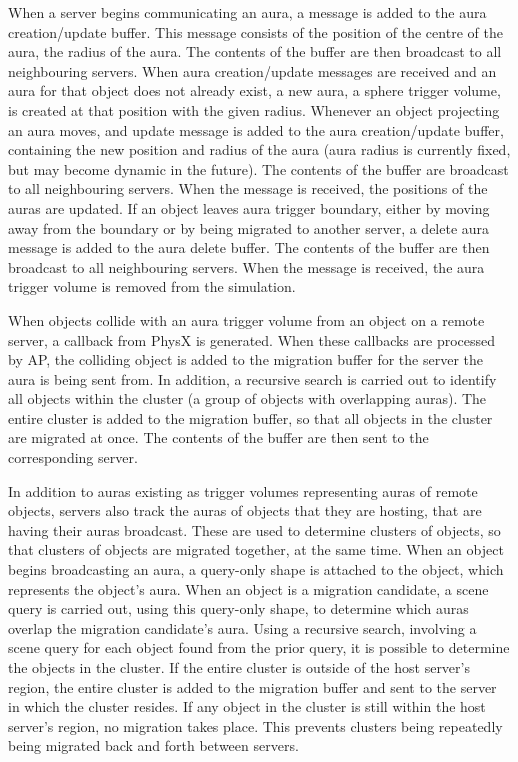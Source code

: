 When a server begins communicating an aura, a message is added to the aura creation/update buffer. This message consists of the position of the centre of the aura, the radius of the aura. %
The contents of the buffer are then broadcast to all neighbouring servers. When aura creation/update messages are received and an aura for that object does not already exist, a new aura, a sphere trigger volume, is created at that position with the given radius.
Whenever an object projecting an aura moves, and update message is added to the aura creation/update buffer, containing the new position and radius of the aura (aura radius is currently fixed, but may become dynamic in the future). The contents of the buffer are broadcast to all neighbouring servers. When the message is received, the positions of the auras are updated. 
If an object leaves aura trigger boundary, either by moving away from the boundary or by being migrated to another server, a delete aura message is added to the aura delete buffer. The contents of the buffer are then broadcast to all neighbouring servers. When the message is received, the aura trigger volume is removed from the simulation.

When objects collide with an aura trigger volume from an object on a remote server, a callback from PhysX is generated. When these callbacks are processed by AP, the colliding object is added to the migration buffer for the server the aura is being sent from. In addition, a recursive search is carried out to identify all objects within the cluster (a group of objects with overlapping auras). The entire cluster is added to the migration buffer, so that all objects in the cluster are migrated at once. The contents of the buffer are then sent to the corresponding server.

In addition to auras existing as trigger volumes representing auras of remote objects, servers also track the auras of objects that they are hosting, that are having their auras broadcast. These are used to determine clusters of objects, so that clusters of objects are migrated together, at the same time. When an object begins broadcasting an aura, a query-only shape is attached to the object, which represents the object's aura. When an object is a migration candidate, a scene query is carried out, using this query-only shape, to determine which auras overlap the migration candidate's aura. Using a recursive search, involving a scene query for each object found from the prior query, it is possible to determine the objects in the cluster. If the entire cluster is outside of the host server's region, the entire cluster is added to the migration buffer and sent to the server in which the cluster resides. If any object in the cluster is still within the host server's region, no migration takes place. This prevents clusters being repeatedly being migrated back and forth between servers.

